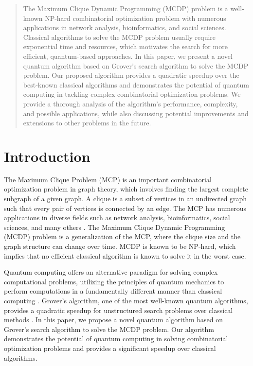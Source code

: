 \begin{abstract}
The Maximum Clique Dynamic Programming (MCDP) problem is a well-known NP-hard combinatorial optimization problem with numerous applications in network analysis, bioinformatics, and social sciences. Classical algorithms to solve the MCDP problem usually require exponential time and resources, which motivates the search for more efficient, quantum-based approaches. In this paper, we present a novel quantum algorithm based on Grover's search algorithm to solve the MCDP problem. Our proposed algorithm provides a quadratic speedup over the best-known classical algorithms and demonstrates the potential of quantum computing in tackling complex combinatorial optimization problems. We provide a thorough analysis of the algorithm's performance, complexity, and possible applications, while also discussing potential improvements and extensions to other problems in the future.

\end{abstract}

\section{Introduction}

The Maximum Clique Problem (MCP) is an important combinatorial optimization problem in graph theory, which involves finding the largest complete subgraph of a given graph. A clique is a subset of vertices in an undirected graph such that every pair of vertices is connected by an edge. The MCP has numerous applications in diverse fields such as network analysis, bioinformatics, social sciences, and many others \cite{applications}. The Maximum Clique Dynamic Programming (MCDP) problem is a generalization of the MCP, where the clique size and the graph structure can change over time. MCDP is known to be NP-hard, which implies that no efficient classical algorithm is known to solve it in the worst case.

Quantum computing offers an alternative paradigm for solving complex computational problems, utilizing the principles of quantum mechanics to perform computations in a fundamentally different manner than classical computing \cite{nielsen_chuang}. Grover's algorithm, one of the most well-known quantum algorithms, provides a quadratic speedup for unstructured search problems over classical methods \cite{grover}. In this paper, we propose a novel quantum algorithm based on Grover's search algorithm to solve the MCDP problem. Our algorithm demonstrates the potential of quantum computing in solving combinatorial optimization problems and provides a significant speedup over classical algorithms.

